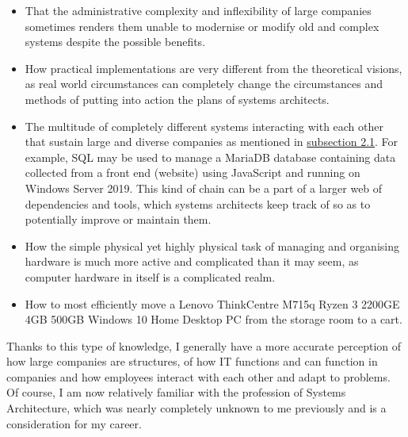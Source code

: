 \begin{itemize}
    \item That the administrative complexity and inflexibility of large
          companies sometimes renders them unable to modernise or modify old and
          complex systems despite the possible benefits.
    \item How practical implementations are very different from the theoretical
          visions, as real world circumstances can completely change the
          circumstances and methods of putting into action the plans of systems
          architects.
    \item The multitude of completely different systems interacting with each
          other that sustain large and diverse companies as mentioned in
          \hyperlink{subsection.2.1}{subsection 2.1}. For example, SQL may be
          used to manage a MariaDB database containing data collected from a
          front end (website) using JavaScript and running on Windows Server
          2019. This kind of chain can be a part of a larger web of dependencies
          and tools, which systems architects keep track of so as to potentially
          improve or maintain them.
    \item How the simple physical yet highly physical task of managing and
          organising hardware is much more active and complicated than it may
          seem, as computer hardware in itself is a complicated realm.
    \item How to most efficiently move a Lenovo ThinkCentre M715q Ryzen 3 2200GE
          4GB 500GB Windows 10 Home Desktop PC from the storage room to a cart.
\end{itemize}

Thanks to this type of knowledge, I generally have a more accurate perception of
how large companies are structures, of how IT functions and can function in
companies and how employees interact with each other and adapt to problems. Of
course, I am now relatively familiar with the profession of Systems
Architecture, which was nearly completely unknown to me previously and is a
consideration for my career.
